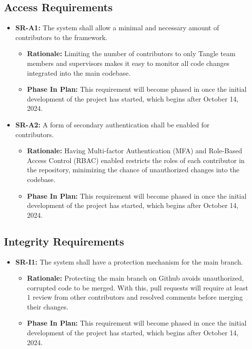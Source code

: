 \documentclass[12pt]{article}
\begin{document}
\subsection{Access Requirements}
\begin{itemize}
  \item \label{SR-A1} \textbf{SR-A1:} The system shall allow a minimal and necessary amount of contributors to the framework.
  \begin{itemize}
    \item \textbf{Rationale:} Limiting the number of contributors to only Tangle team members and supervisors makes it easy to monitor all code changes integrated into the main codebase.
    \item \textbf{Phase In Plan:} This requirement will become phased in once the initial development of the project has started, which begins after October 14, 2024. 
  \end{itemize}
  \item \label{SR-A2} \textbf{SR-A2:} A form of secondary authentication shall be enabled for contributors.
  \begin{itemize}
    \item \textbf{Rationale:} Having Multi-factor Authentication (MFA) and Role-Based Access Control (RBAC) enabled restricts the roles of each contributor in the repository, minimizing the chance of unauthorized changes into the codebase.
    \item \textbf{Phase In Plan:} This requirement will become phased in once the initial development of the project has started, which begins after October 14, 2024. 
  \end{itemize}
\end{itemize}

\subsection{Integrity Requirements}
\begin{itemize}
  \item \label{SR-I1} \textbf{SR-I1:} The system shall have a protection mechanism for the main branch.
  \begin{itemize}
    \item \textbf{Rationale:} Protecting the main branch on Github avoids unauthorized, corrupted code to be merged. With this, pull requests will require at least 1 review from other contributors and resolved comments before merging their changes.
    \item \textbf{Phase In Plan:} This requirement will become phased in once the initial development of the project has started, which begins after October 14, 2024. 
  \end{itemize}
\end{itemize}
\end{document}
